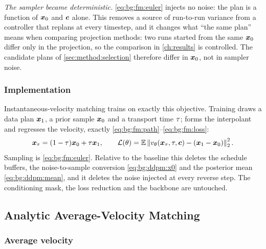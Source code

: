 \emph{The sampler became deterministic.} \eqref{eq:bg:fm:euler} injects no noise: the plan is
a function of $\boldsymbol{x}_{0}$ and $\boldsymbol{c}$ alone. This removes a source of run-to-run variance
from a controller that replans at every timestep, and it changes what ``the same plan'' means
when comparing projection methods: two runs started from the same $\boldsymbol{x}_{0}$ differ only in the
projection, so the comparison in \autoref{ch:results} is controlled. The candidate plans of
\autoref{sec:method:selection} therefore differ in $\boldsymbol{x}_{0}$, not in sampler noise.

\subsubsection*{Implementation}

Instantaneous-velocity matching trains on exactly this objective. Training draws a data plan $\boldsymbol{x}_{1}$, a prior sample $\boldsymbol{x}_{0}$ and a transport time
$\tau$; forms the interpolant and regresses the velocity, exactly
\eqref{eq:bg:fm:path}--\eqref{eq:bg:fm:loss}:
\begin{equation}\label{eq:method:engine:fm}
  \boldsymbol{x}_{\tau} = (1-\tau)\boldsymbol{x}_{0} + \tau\boldsymbol{x}_{1},
  \qquad
  \mathcal{L}(\theta) = \mathbb{E}\left\|
     v_{\theta}(\boldsymbol{x}_{\tau},\tau,\boldsymbol{c}) - (\boldsymbol{x}_{1}-\boldsymbol{x}_{0})
  \right\|_{2}^{2}.
\end{equation}
Sampling is \eqref{eq:bg:fm:euler}. Relative to the baseline this deletes the schedule buffers,
the noise-to-sample conversion \eqref{eq:bg:ddpm:x0} and the posterior mean
\eqref{eq:bg:ddpm:mean}, and it deletes the noise injected at every reverse step. The
conditioning mask, the loss reduction and the backbone are untouched.

\subsection{Analytic Average-Velocity Matching}\label{sec:method:meanflow}

\subsubsection*{Average velocity}

